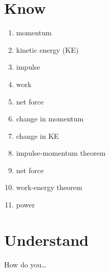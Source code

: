 \documentclass[]{exam}
\begin{document}
\section*{Know}

\begin{multicols}{3}
\begin{enumerate}[itemsep=0pt]
    \item momentum
    \item kinetic energy (KE)
    \item impulse
    \item work
    \item net force
    \item change in momentum
    \item change in KE
    \item impulse-momentum theorem
    \item net force
    \item work-energy theorem
    \item power
\end{enumerate}
\end{multicols}

\section*{Understand}

How do you\dots
\end{document}
